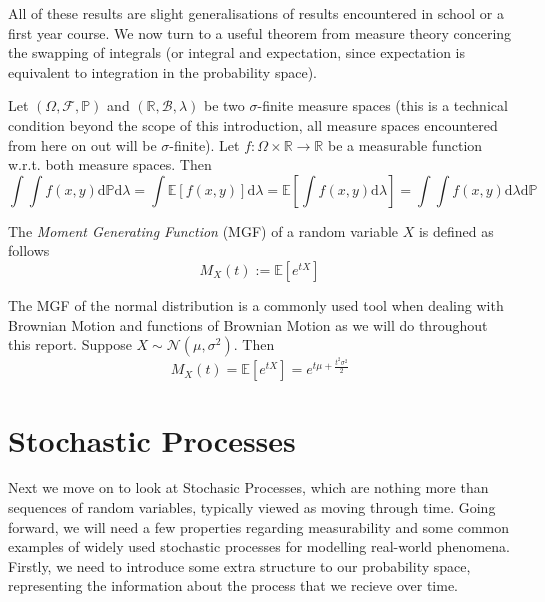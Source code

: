 All of these results are slight generalisations of results encountered in school or 
a first year course. We now turn to a useful theorem from measure theory concering 
the swapping of integrals (or integral and expectation, since expectation is 
equivalent to integration in the probability space).

\begin{theorem}
    Let $(\Omega,\mathcal{F},\mathbb{P})$ and $(\mathbb{R},\mathcal{B},\lambda)$
    be two $\sigma$-finite measure spaces (this is a technical condition beyond the 
    scope of this introduction, all measure spaces encountered from here on out will
    be $\sigma$-finite). Let $f:\Omega\times\mathbb{R}\rightarrow\mathbb{R}$ be a 
    measurable function w.r.t. both measure spaces. Then
    \begin{equation}\label{eq:1.13}
        \int\int f(x,y)\mathrm d\mathbb{P}\mathrm d\lambda=\int\mathbb{E}[f(x,y)]\mathrm d\lambda=\mathbb{E}\left[\int f(x,y)\mathrm d\lambda\right]=\int \int f(x,y)\mathrm d\lambda\mathrm d\mathbb{P}
    \end{equation}
\end{theorem}

\begin{definition}
    The \emph{Moment Generating Function} (MGF) of a random variable $X$ is defined as follows
    \begin{equation*}
        M_X(t):=\mathbb{E}[e^{tX}]
    \end{equation*}
\end{definition}

\begin{remark}
    The MGF of the normal distribution is a commonly used tool when dealing with
    Brownian Motion and functions of Brownian Motion as we will do throughout this
    report. Suppose $X\sim\mathcal{N}(\mu,\sigma^2)$. Then
    \begin{equation}
        M_X(t)=\mathbb{E}[e^{tX}]=e^{t\mu+\frac{t^2\sigma^2}{2}}
    \end{equation}
\end{remark}

\section{Stochastic Processes}\label{sec:1.4}

Next we move on to look at Stochasic Processes, which are nothing more than sequences
of random variables, typically viewed as moving through time. Going forward, we will 
need a few properties regarding measurability and some common examples of widely used 
stochastic processes for modelling real-world phenomena. Firstly, we need to introduce 
some extra structure to our probability space, representing the information about the 
process that we recieve over time.

